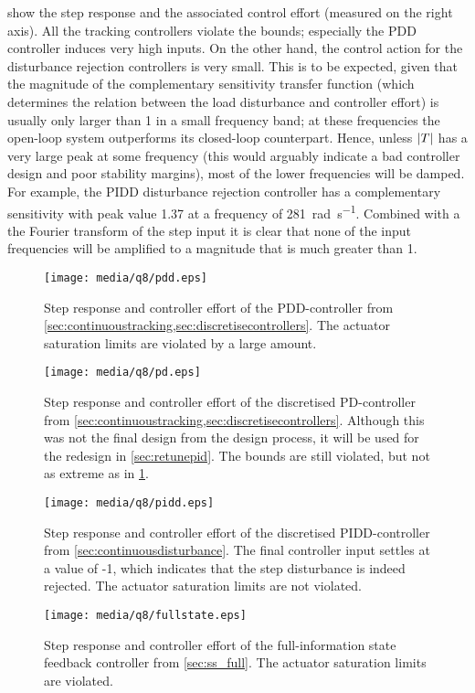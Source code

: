  show the step response and the associated control effort (measured on the right axis). All the tracking controllers violate the bounds; especially the PDD controller induces very high inputs.
On the other hand, the control action for the disturbance rejection controllers is very small. This is to be expected, given that the magnitude of the complementary sensitivity transfer function (which determines the relation between the load disturbance and controller effort) is usually only larger than 1 in a small frequency band; at these frequencies the open-loop system outperforms its closed-loop counterpart. Hence, unless $\abs{T}$ has a very large peak at some frequency (this would arguably indicate a bad controller design and poor stability margins), most of the lower frequencies will be damped. For example, the PIDD 
disturbance rejection controller has a complementary sensitivity with peak value 1.37 at a frequency of \SI{281}{\radian\per\second}. Combined with a the Fourier transform of the step input it is clear that none of the input frequencies will be amplified to a magnitude that is much greater than 1.
\begin{figure}[ht!]
    \centering
    \texttt{[image: media/q8/pdd.eps]}
    \caption{Step response and controller effort of the PDD-controller from \cref{sec:continuoustracking,sec:discretisecontrollers}. The actuator saturation limits are violated by a large amount.}
    \label{fig:q8_pdd}
\end{figure}
\begin{figure}[ht!]
    \centering
    \texttt{[image: media/q8/pd.eps]}
    \caption{Step response and controller effort of the discretised PD-controller from \cref{sec:continuoustracking,sec:discretisecontrollers}. Although this was not the final design from the design process, it will be used for the redesign in \cref{sec:retunepid}. The bounds are still violated, but not as extreme as in \cref{fig:q8_pdd}.}
    \label{fig:q8_pd}
\end{figure}
\begin{figure}[ht!]
    \centering
    \texttt{[image: media/q8/pidd.eps]}
    \caption{Step response and controller effort of the discretised PIDD-controller from \cref{sec:continuousdisturbance}. The final controller input settles at a value of -1, which indicates that the step disturbance is indeed rejected. The actuator saturation limits are not violated.}
    \label{fig:q8_pidd}
\end{figure}
\begin{figure}[ht!]
    \centering
    \texttt{[image: media/q8/fullstate.eps]}
    \caption{Step response and controller effort of the full-information state feedback controller from \cref{sec:ss_full}. The actuator saturation limits are violated.}
    \label{fig:q8_fullstate}
\end{figure}

